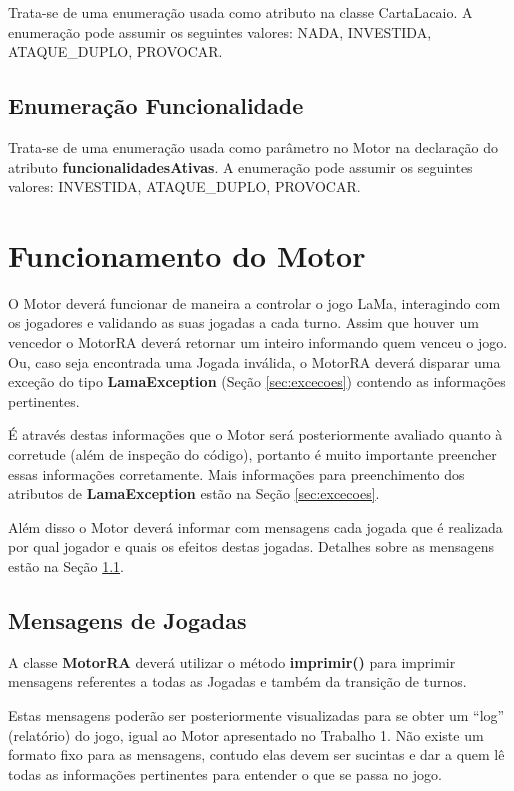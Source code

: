 \documentclass[10pt]{article}
\begin{document}
Trata-se de uma enumeração usada como atributo na classe CartaLacaio. A enumeração pode assumir os seguintes valores: NADA, INVESTIDA, ATAQUE\_DUPLO, PROVOCAR.

\subsection{Enumeração Funcionalidade} \label{ssec:funcionalidade}

Trata-se de uma enumeração usada como parâmetro no Motor na declaração do atributo \textbf{funcionalidadesAtivas}. A enumeração pode assumir os seguintes valores: INVESTIDA, ATAQUE\_DUPLO, PROVOCAR.

\section{Funcionamento do Motor}

O Motor deverá funcionar de maneira a controlar o jogo LaMa, interagindo com os jogadores e validando as suas jogadas a cada turno. Assim que houver um vencedor o MotorRA deverá retornar um inteiro informando quem venceu o jogo. Ou, caso seja encontrada uma Jogada inválida, o MotorRA deverá disparar uma exceção do tipo \textbf{LamaException} (Seção \ref{sec:excecoes}) contendo as informações pertinentes.

É através destas informações que o Motor será posteriormente avaliado quanto à corretude (além de inspeção do código), portanto é muito importante preencher essas informações corretamente. Mais informações para preenchimento dos atributos de \textbf{LamaException} estão na Seção \ref{sec:excecoes}.

Além disso o Motor deverá informar com mensagens cada jogada que é realizada por qual jogador e quais os efeitos destas jogadas. Detalhes sobre as mensagens estão na Seção \ref{sec:mensagens}.

\subsection{Mensagens de Jogadas} \label{sec:mensagens}

A classe \textbf{MotorRA} deverá utilizar o método \textbf{imprimir()} para imprimir mensagens referentes a todas as Jogadas e também da transição de turnos.

Estas mensagens poderão ser posteriormente visualizadas para se obter um ``log'' (relatório) do jogo, igual ao Motor apresentado no Trabalho 1. Não existe um formato fixo para as mensagens, contudo elas devem ser sucintas e dar a quem lê todas as informações pertinentes para entender o que se passa no jogo.
\end{document}
